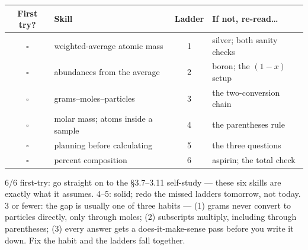 \documentclass{apchem-worksheet}
\begin{document}
\renewcommand{\arraystretch}{1.35}
\noindent\begin{tabular}{@{}c p{6.6cm} c p{4.4cm}@{}}
\toprule
\textbf{First try?} & \textbf{Skill} & \textbf{Ladder} &
  \textbf{If not, re-read\ldots}\\
\midrule
$\square$ & weighted-average atomic mass & 1 & silver; both sanity checks \\
$\square$ & abundances from the average & 2 & boron; the $(1-x)$ setup \\
$\square$ & grams--moles--particles & 3 & the two-conversion chain \\
$\square$ & molar mass; atoms inside a sample & 4 & the parentheses rule \\
$\square$ & planning before calculating & 5 & the three questions \\
$\square$ & percent composition & 6 & aspirin; the total check \\
\bottomrule
\end{tabular}

\begin{apcnote}
6/6 first-try: go straight on to the \S3.7--3.11 self-study --- these six
skills are exactly what it assumes. 4--5: solid; redo the missed ladders
tomorrow, not today. 3 or fewer: the gap is usually one of three habits
--- (1) grams never convert to particles directly, only through moles;
(2) subscripts multiply, including through parentheses; (3) every answer
gets a does-it-make-sense pass before you write it down. Fix the habit
and the ladders fall together.
\end{apcnote}
\end{document}
